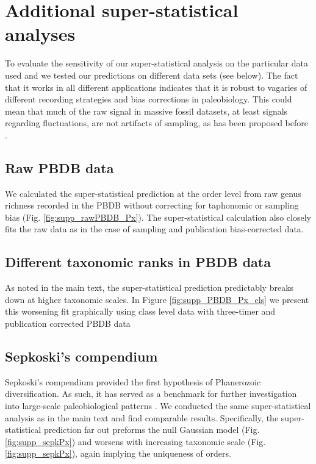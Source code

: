 \documentclass[12pt]{article}
\let\citep=\cite
\begin{document}
\section{Additional super-statistical analyses}
To evaluate the sensitivity of our super-statistical analysis on the
particular data used and we tested our predictions on different data
sets (see below). The fact that it works in all different applications
indicates that it is robust to vagaries of different recording
strategies and bias corrections in paleobiology. This could mean that
much of the raw signal in massive fossil datasets, at least signals
regarding fluctuations, are not artifacts of sampling, as has been
proposed before \citep{hannisdal2011}.

\subsection{Raw PBDB data} \label{sec:rawPBDB}
We calculated the super-statistical prediction at the order level from
raw genus richness recorded in the PBDB without correcting for
taphonomic or sampling bias (Fig. \ref{fig:supp_rawPBDB_Px}). The
super-statistical calculation also closely fits the raw data as in the
case of sampling and publication bias-corrected data.

\subsection{Different taxonomic ranks in PBDB data}
As noted in the main text, the super-statistical prediction
predictably breaks down at higher taxonomic scales. In Figure
\ref{fig:supp_PBDB_Px_cls} we present this worsening fit graphically
using class level data with three-timer and publication corrected PBDB
data

\subsection{Sepkoski's compendium} \label{sec:suppSepk}
Sepkoski's compendium \citep{sepkoski1992} provided the first
hypothesis of Phanerozoic diversification.  As such, it has served as
a benchmark for further investigation into large-scale paleobiological
patterns \citep{alroy08}.  We conducted the same super-statistical
analysis as in the main text and find comparable results.
Specifically, the super-statistical prediction far out preforms the
null Gaussian model (Fig. \ref{fig:supp_sepkPx}) and worsens with
increasing taxonomic scale (Fig. \ref{fig:supp_sepkPx}), again
implying the uniqueness of orders.
\end{document}
